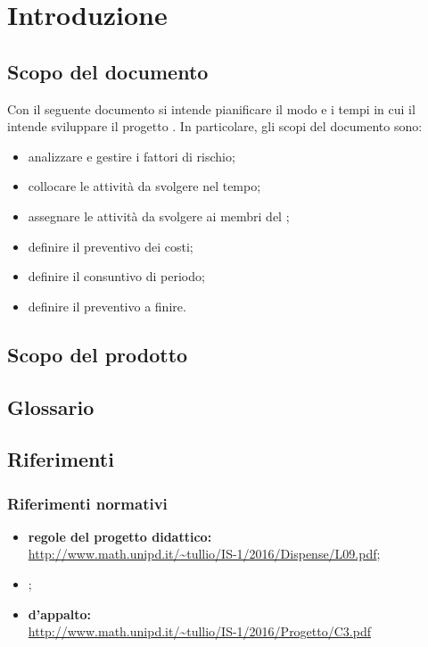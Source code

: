\section {Introduzione}
	\subsection {Scopo del documento}
	Con il seguente documento si intende pianificare il modo e i tempi in cui il  intende sviluppare il progetto \progetto. In particolare, gli scopi del documento sono:
	\begin{itemize}
	 \item {analizzare e gestire i fattori di rischio;}
	 \item {collocare le attività da svolgere nel tempo;}
	 \item {assegnare le attività da svolgere ai membri del ;}
	 \item {definire il preventivo dei costi;}
	 \item {definire il consuntivo di periodo;}
	 \item {definire il preventivo a finire.}
	\end{itemize}
	\subsection {Scopo del prodotto}
	\introScopo
	\subsection {Glossario}
	\introGlossario
	\subsection {Riferimenti}
		\subsubsection{Riferimenti normativi}
		\begin{itemize}
				\item \textbf{regole del progetto didattico:}\\
                \url{http://www.math.unipd.it/~tullio/IS-1/2016/Dispense/L09.pdf};
				\item {\ndpv};
				\item \textbf{ d'appalto:}\\
                \url{http://www.math.unipd.it/~tullio/IS-1/2016/Progetto/C3.pdf}
		\end{itemize}
